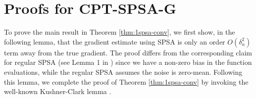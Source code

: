 \section{Proofs for CPT-SPSA-G}
\label{appendix:1spsa}

To prove the main result in Theorem \ref{thm:1spsa-conv}, we first show, in the following lemma, that the gradient estimate using SPSA is only an order $O(\delta_n^2)$ term away from the true gradient. The proof differs from the corresponding claim for regular SPSA (see Lemma 1 in \cite{spall}) since we have a non-zero bias in the function evaluations, while the regular SPSA assumes the noise is zero-mean. Following this lemma, we complete the proof of Theorem \ref{thm:1spsa-conv} by invoking the well-known Kushner-Clark lemma \cite{kushner-clark}.

